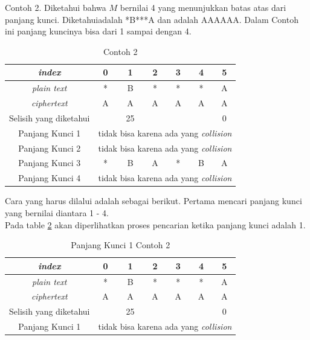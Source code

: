 	 Contoh 2. Diketahui bahwa $M$ bernilai 4 yang menunjukkan batas atas dari panjang kunci. Diketahui\plaintext adalah *B***A dan \ciphertext adalah AAAAAA. Dalam Contoh ini panjang kuncinya bisa dari 1 sampai dengan 4. 
	 \begin{table}[H]
	 	\centering
	 	\begin{tabular}{|c|c|c|c|c|c|c|}\hline
		\textit{index}&0&1&2&3&4&5\\ \hline
	 	\textit{plain text}&*&B&*&*&*&A\\ \hline
	 	\textit{ciphertext}&A&A&A&A&A&A\\ \hline
	 	Selisih yang diketahui& &25& & & &0\\ \hline
	 	Panjang Kunci 1 & \multicolumn{6}{c|}{tidak bisa karena ada yang \textit{collision}}\\ \hline
	 	Panjang Kunci 2 & \multicolumn{6}{c|}{tidak bisa karena ada yang \textit{collision}}\\ \hline
	 	Panjang Kunci 3 &*&B&A&*&B&A \\ \hline
	 	Panjang Kunci 4 & \multicolumn{6}{c|}{tidak bisa karena ada yang \textit{collision}}\\ \hline
	 	\end{tabular}
	 	\caption{Contoh 2}
	 	\label{tab:contoh2}
	\end{table}
	Cara yang harus dilalui adalah sebagai berikut. Pertama mencari panjang kunci yang bernilai diantara 1 - 4. \\
	Pada table \ref{tab:k1contoh2} akan diperlihatkan proses pencarian ketika panjang kunci adalah 1.
	\begin{table}[H]
	 	\centering
	 	\setlength{\arrayrulewidth}{.08em}
	 	\begin{tabular}{|c|c|c|c|c|c|c|}\hline
		\textit{index}&0&1&2&3&4&5\\ \hline
	 	\textit{plain text}&\cellcolor{blue!15}*&\cellcolor{yellow!25}B&\cellcolor{green!15}*&\cellcolor{lime!25}*&\cellcolor{pink!30}*&\cellcolor{red!25}A\\ \hline
	 	\textit{ciphertext}&\cellcolor{blue!15}A&\cellcolor{yellow!25}A&\cellcolor{green!15}A&\cellcolor{lime!25}A&\cellcolor{pink!30}A&\cellcolor{red!25}A\\ \hline
	 	Selisih yang diketahui& &25& & & &0\\ \hline
	 	Panjang Kunci 1 & \multicolumn{6}{c|}{tidak bisa karena ada yang \textit{collision}}\\ \hline
	 	\end{tabular}
	 	\caption{Panjang Kunci 1 Contoh 2}
	 	\label{tab:k1contoh2}
	\end{table}	
	
